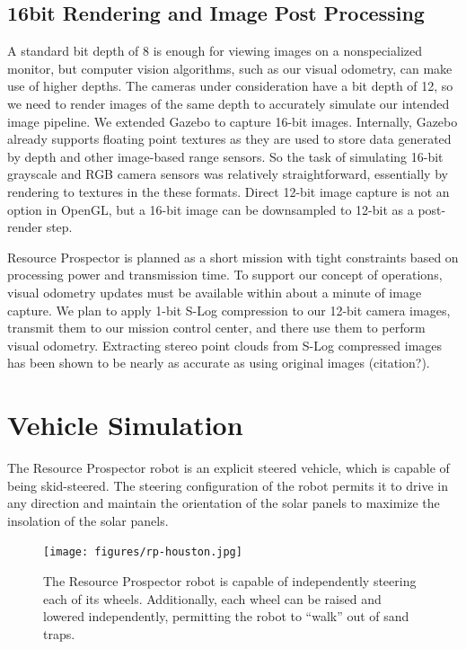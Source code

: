\documentclass[twocolumn,letterpaper]{IEEEAerospaceCLS}  %
\begin{document}
\subsection{16bit Rendering and Image Post Processing}
A standard bit depth of 8 is enough for viewing images on a nonspecialized monitor, but computer vision algorithms, such as our visual odometry, can make use of higher depths. The cameras under consideration have a bit depth of 12, so we need to render images of the same depth to accurately simulate our intended image pipeline. We extended Gazebo to capture 16-bit images. Internally, Gazebo already supports floating point textures as they are used to store data generated by depth and other image-based range sensors. So the task of simulating 16-bit grayscale and RGB camera sensors was relatively straightforward, essentially by rendering to textures in the these formats. Direct 12-bit image capture is not an option in OpenGL, but a 16-bit image can be downsampled to 12-bit as a post-render step.

Resource Prospector is planned as a short mission with tight constraints based on processing power and transmission time. To support our concept of operations, visual odometry updates must be available within about a minute of image capture. We plan to apply 1-bit S-Log compression to our 12-bit camera images, transmit them to our mission control center, and there use them to perform visual odometry. Extracting stereo point clouds from S-Log compressed images has been shown to be nearly as accurate as using original images (citation?).

\section{Vehicle Simulation}

The Resource Prospector robot is an explicit steered vehicle, which is capable of being skid-steered. The steering configuration of the robot permits it to drive in any direction and maintain the orientation of the solar panels to maximize the insolation of the solar panels.  

\begin{figure}[htp!]
\centering
\texttt{[image: figures/rp-houston.jpg]}
\caption{The Resource Prospector robot is capable of independently steering each of its wheels.  Additionally, each wheel can be raised and lowered independently, permitting the robot to ``walk'' out of sand traps.  \label{fig:rp-houston}}
\end{figure}
\end{document}
